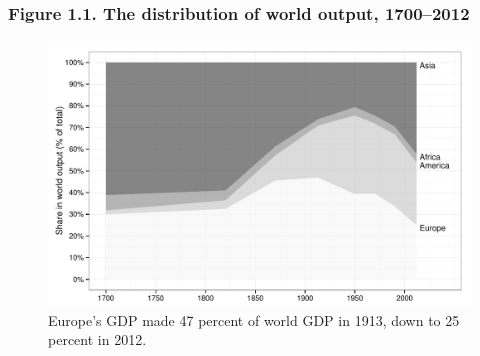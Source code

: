 \documentclass[t]{beamer}\usepackage[]{graphicx}\usepackage[]{color}
\newenvironment{knitrout}{}{} %
\begin{document}
\begin{frame}[label=Figure_1_1]
\frametitle{Figure 1.1. The distribution of world output, 1700--2012}
\begin{figure}[t]
\begin{minipage}[b]{\textwidth}
\centering
\begin{knitrout}\footnotesize
{}\color{fgcolor}

{\centering \includegraphics[width=1\linewidth]{figures/bw/Figure_1_1} 

}



\end{knitrout}
\caption{Europe's GDP made 47 percent of world GDP in 1913, down to 25 percent in 2012.}
\end{minipage}
\end{figure}
\end{frame}
\end{document}
